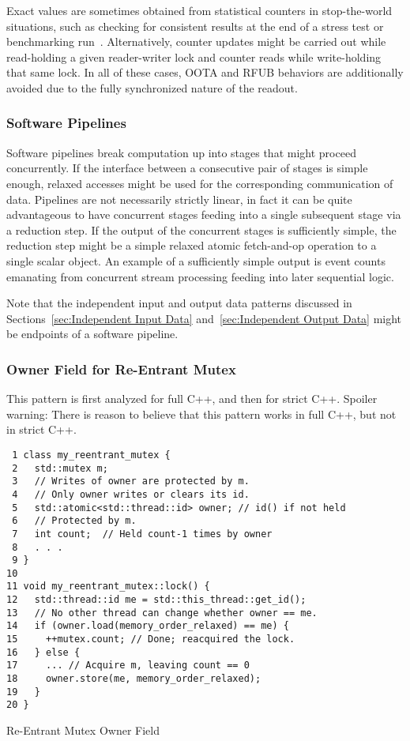 \documentclass[10]{article}
\begin{document}
Exact values are sometimes obtained from statistical counters in
stop-the-world situations, such as checking for consistent results
at the end of a stress test or benchmarking
run~\cite[Sections 5.3 and 5.4]{McKenney2018ParallelProgramming-2018-12-08a}.
Alternatively, counter updates might be carried out while read-holding
a given reader-writer lock and counter reads while write-holding
that same lock.
In all of these cases, OOTA and RFUB behaviors are additionally avoided due
to the fully synchronized nature of the readout.

\subsubsection{Software Pipelines}
\label{sec:Software Pipelines}

Software pipelines break computation up into stages that might proceed
concurrently.
If the interface between a consecutive pair of stages is simple enough,
relaxed accesses might be used for the corresponding communication of data.
Pipelines are not necessarily strictly linear, in fact it can be quite
advantageous to have concurrent stages feeding into a single subsequent
stage via a reduction step.
If the output of the concurrent stages is sufficiently simple, the
reduction step might be a simple relaxed atomic fetch-and-op operation
to a single scalar object.
An example of a sufficiently simple output is event counts emanating from
concurrent stream processing feeding into later sequential logic.

Note that the independent input and output data patterns discussed in
Sections~\ref{sec:Independent Input Data} and~\ref{sec:Independent Output Data}
might be endpoints of a software pipeline.

\subsubsection{Owner Field for Re-Entrant Mutex}
\label{sec:Owner Field for Re-Entrant Mutex}

This pattern is first analyzed for full C++, and then for strict C++.
Spoiler warning:  There is reason to believe that this pattern works
in full C++, but not in strict C++.

\begin{listing}[tbp]
\begin{verbatim}
 1 class my_reentrant_mutex {
 2   std::mutex m;
 3   // Writes of owner are protected by m.
 4   // Only owner writes or clears its id.
 5   std::atomic<std::thread::id> owner; // id() if not held
 6   // Protected by m.
 7   int count;  // Held count-1 times by owner
 8   . . .
 9 }
10
11 void my_reentrant_mutex::lock() {
12   std::thread::id me = std::this_thread::get_id();
13   // No other thread can change whether owner == me.
14   if (owner.load(memory_order_relaxed) == me) {
15     ++mutex.count; // Done; reacquired the lock.
16   } else {
17     ... // Acquire m, leaving count == 0
18     owner.store(me, memory_order_relaxed);
19   }
20 }
\end{verbatim}
\caption{Re-Entrant Mutex Owner Field}
\label{lst:Re-Entrant Mutex Owner Field}
\end{listing}
\end{document}
